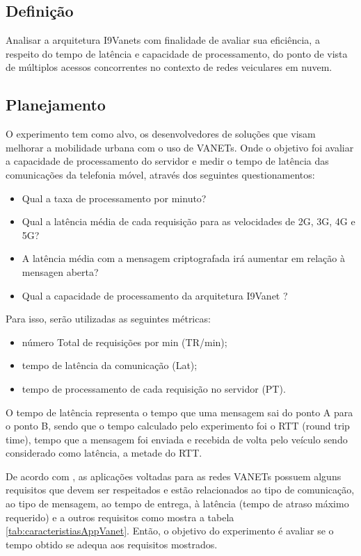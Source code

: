 \documentclass[
	12pt,				%
	oneside,			%
	a4paper,			%
	english,			%
	brazil				%
	]{abntex2ppgsi}
\begin{document}
\subsection{Definição}

Analisar a arquitetura I9Vanets com finalidade de avaliar sua eficiência, a respeito do tempo de latência e capacidade de processamento, do ponto de vista de múltiplos acessos concorrentes no contexto de redes veiculares em nuvem.

\subsection{Planejamento}
O experimento tem como alvo, os desenvolvedores de soluções que visam melhorar a mobilidade urbana com o uso de VANETs. Onde o objetivo foi avaliar a capacidade de processamento do servidor e medir o tempo de latência das comunicações da telefonia móvel, através dos seguintes questionamentos:
\begin{itemize}
	\item {Qual a taxa de processamento por minuto?}
	\item {Qual a latência média de cada requisição para as velocidades de 2G, 3G, 4G e 5G?}
	\item {A latência média com a mensagem criptografada irá aumentar em relação à mensagen aberta?}
	\item {Qual a capacidade de processamento da arquitetura I9Vanet ?}
\end{itemize} 

Para isso, serão utilizadas as seguintes métricas: 
\begin{itemize}
	\item {número Total de requisições por min (TR/min);}
	\item {tempo de latência da comunicação (Lat);}
	\item {tempo de processamento de cada requisição no servidor (PT).}
\end{itemize} 

O tempo de latência representa o tempo que uma mensagem sai do ponto A para o ponto B, sendo que o tempo calculado pelo experimento foi o RTT (round trip time), tempo que a mensagem foi enviada e recebida de volta pelo veículo sendo considerado como latência, a metade do RTT.

De acordo com ,  as aplicações voltadas para as redes VANETs possuem alguns requisitos que devem ser respeitados e estão relacionados ao tipo de comunicação, ao tipo de mensagem, ao tempo de entrega, à latência (tempo de atraso máximo requerido)  e a outros requisitos como mostra a tabela \ref{tab:caracteristiasAppVanet}. Então, o objetivo do experimento é avaliar se o tempo obtido se adequa aos requisitos mostrados.
\end{document}
